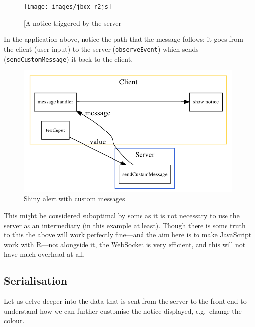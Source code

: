 \documentclass[
  10pt,
]{krantz}
\begin{document}
\begin{figure}[H]

{\centering \texttt{[image: images/jbox-r2js]} 

}

\caption{[A notice triggered by the server}\label{fig:jbox-r2js}
\end{figure}

In the application above, notice the path that the message follows: it goes from the client (user input) to the server (\texttt{observeEvent}) which sends (\texttt{sendCustomMessage}) it back to the client.

\begin{figure}[H]

{\centering \includegraphics[width=1\linewidth]{images/04-custom-msg} 

}

\caption{Shiny alert with custom messages}\label{fig:shiny-alert-diagram}
\end{figure}

This might be considered suboptimal by some as it is not necessary to use the server as an intermediary (in this example at least). Though there is some truth to this the above will work perfectly fine---and the aim here is to make JavaScript work with R---not alongside it, the WebSocket is very efficient, and this will not have much overhead at all.

\hypertarget{shiny-intro-serialise}{%
\subsection{Serialisation}\label{shiny-intro-serialise}}

Let us delve deeper into the data that is sent from the server to the front-end to understand how we can further customise the notice displayed, e.g.~change the colour.
\end{document}

